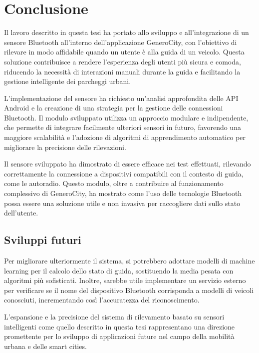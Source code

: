 \chapter{Conclusione}
Il lavoro descritto in questa tesi ha portato allo sviluppo e all'integrazione di un sensore Bluetooth all'interno dell'applicazione GeneroCity, con l'obiettivo di rilevare in modo affidabile quando un utente è alla guida di un veicolo. Questa soluzione contribuisce a rendere l'esperienza degli utenti più sicura e comoda, riducendo la necessità di interazioni manuali durante la guida e facilitando la gestione intelligente dei parcheggi urbani.

L'implementazione del sensore ha richiesto un'analisi approfondita delle API Android e la creazione di una strategia per la gestione delle connessioni Bluetooth. Il modulo sviluppato utilizza un approccio modulare e indipendente, che permette di integrare facilmente ulteriori sensori in futuro, favorendo una maggiore scalabilità e l'adozione di algoritmi di apprendimento automatico per migliorare la precisione delle rilevazioni.

Il sensore sviluppato ha dimostrato di essere efficace nei test effettuati, rilevando correttamente la connessione a dispositivi compatibili con il contesto di guida, come le autoradio. Questo modulo, oltre a contribuire al funzionamento complessivo di GeneroCity, ha mostrato come l'uso delle tecnologie Bluetooth possa essere una soluzione utile e non invasiva per raccogliere dati sullo stato dell'utente.


\section{Sviluppi futuri}
Per migliorare ulteriormente il sistema, si potrebbero adottare modelli di machine learning per il calcolo dello stato di guida, sostituendo la media pesata con algoritmi più sofisticati. Inoltre, sarebbe utile implementare un servizio esterno per verificare se il nome del dispositivo Bluetooth corrisponda a modelli di veicoli conosciuti, incrementando così l'accuratezza del riconoscimento.

L'espansione e la precisione del sistema di rilevamento basato su sensori intelligenti come quello descritto in questa tesi rappresentano una direzione promettente per lo sviluppo di applicazioni future nel campo della mobilità urbana e delle smart cities.

